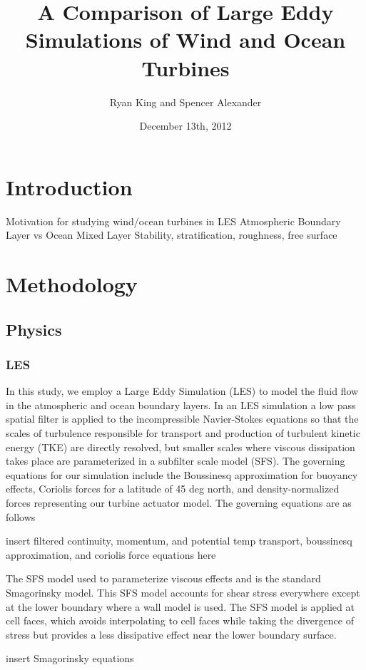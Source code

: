 \documentclass[12pt,letterpaper]{article}
\author{Ryan King and Spencer Alexander}
\title{A Comparison of Large Eddy Simulations of Wind and Ocean Turbines}
\date{December 13th, 2012}
\begin{document}
\maketitle
\section{Introduction}

Motivation for studying wind/ocean turbines in LES
Atmospheric Boundary Layer vs Ocean Mixed Layer
Stability, stratification, roughness, free surface
\section{Methodology}

\subsection{Physics}


\subsubsection{LES}
In this study, we employ a Large Eddy Simulation (LES) to model the fluid flow in the atmospheric and ocean boundary layers.  In an LES simulation a low pass spatial filter is applied to the incompressible Navier-Stokes equations so that the scales of turbulence responsible for transport and production of turbulent kinetic energy (TKE) are directly resolved, but smaller scales where viscous dissipation takes place are parameterized in a subfilter scale model (SFS).  The governing equations for our simulation include the Boussinesq approximation for buoyancy effects, Coriolis forces for a latitude of 45 deg north, and density-normalized forces representing our turbine actuator model.  The governing equations are as follows

insert filtered continuity, momentum, and potential temp transport, boussinesq approximation, and coriolis force equations here

The SFS model used to parameterize viscous effects and is the standard Smagorinsky model.  This SFS model accounts for shear stress everywhere except at the lower boundary where a wall model is used.  The SFS model is applied at cell faces, which avoids interpolating to cell faces while taking the divergence of stress but provides a less dissipative effect near the lower boundary surface.  

insert Smagorinsky equations
\end{document}
